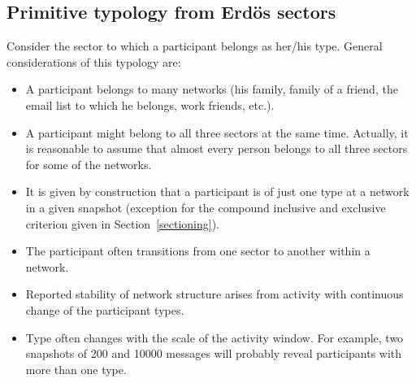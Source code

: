 \documentclass[%
 aip,
 jmp,%
 amsmath,amssymb,
 reprint,%
]{revtex4-1}
\begin{document}


    \subsection{Primitive typology from Erd\"os sectors}\label{sec:pty}
Consider the sector to which a participant belongs as her/his type. General considerations of this typology are:
\begin{itemize}
	\item A participant belongs to many networks (his family, family of a friend, the email list to which he belongs, work friends, etc.).
	\item A participant might belong to all three sectors at the same time. Actually, it is reasonable to assume that almost every person belongs to all three sectors for some of the networks.
	\item It is given by construction that a participant is of just one type at a network in a given snapshot (exception for the compound inclusive and exclusive criterion given in Section~\ref{sectioning}).
	\item The participant often transitions from one sector to another within a network.
	\item Reported stability of network structure arises from activity with continuous change of the participant types.
	\item Type often changes with the scale of the activity window. For example, two snapshots of 200 and 10000 messages will probably reveal participants with more than one type. 
\end{itemize}
\end{document}
